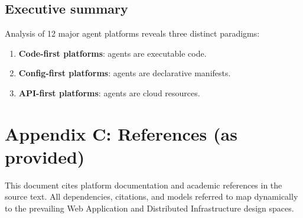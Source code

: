 \documentclass[11pt]{article}
\begin{document}
\subsection{Executive summary}
Analysis of 12 major agent platforms reveals three distinct paradigms:
\begin{enumerate}
  \item \textbf{Code-first platforms}: agents are executable code.
  \item \textbf{Config-first platforms}: agents are declarative manifests.
  \item \textbf{API-first platforms}: agents are cloud resources.
\end{enumerate}

\section{Appendix C: References (as provided)}
This document cites platform documentation and academic references in the source text. All dependencies, citations, and models referred to map dynamically to the prevailing Web Application and Distributed Infrastructure design spaces.
\end{document}
